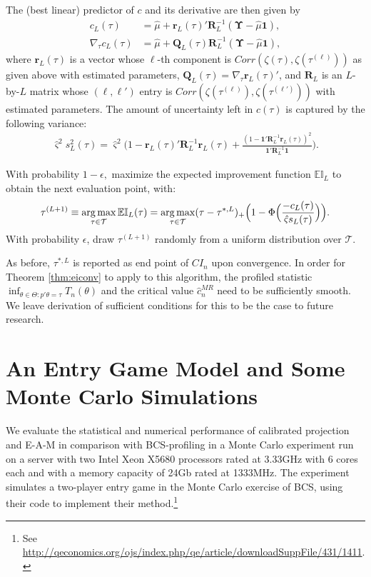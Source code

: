 \documentclass[letterpaper,11pt]{article}
\theoremstyle{myplain}
\theoremstyle{mydefinition}
\theoremstyle{myremark}
\def\argmax{\mathop{\rm arg\,max}}
\newcommand{\cT}{\mathcal{T}}
\newcommand{\EI}{\mathbb{EI}}
\numberwithin{equation}{section}
\numberwithin{figure}{section}
\begin{document}
\begin{appendix}
\begin{description}
	The (best linear) predictor of $c$ and its derivative  are then given by
	\begin{align}
		c_L(\tau)&=\hat\mu+\mathbf{r}_L(\tau)'\mathbf{R}_L^{-1}(\mathbf \Upsilon-\hat\mu \mathbf 1),\label{eq:cLdef_prof}\\
		\nabla_\tau c_L(\tau)&=\hat\mu+\mathbf{Q}_L(\tau)\mathbf{R}_L^{-1}(\mathbf \Upsilon-\hat\mu \mathbf 1),\label{eq:cLgrad_prof}
	\end{align}
	where $\mathbf r_L(\tau)$ is a vector whose $\ell$-th component is $Corr(\zeta(\tau),\zeta(\tau^{(\ell)}))$ as given above with estimated parameters, $\mathbf Q_L(\tau)=\nabla_\tau \mathbf r_L(\tau)'$, and $\mathbf R_L$ is an $L$-by-$L$ matrix whose $(\ell,\ell')$ entry is $Corr(\zeta(\tau^{(\ell)}),\zeta(\tau^{(\ell')}))$ with estimated parameters. The amount of uncertainty left in $c(\tau)$ is captured by the following variance:
\begin{align}
\hat\varsigma^2s^2_L(\tau)= \hat\varsigma^2\Big(1-\mathbf r_L(\tau)'\mathbf R_L^{-1}\mathbf r_L(\tau)+\frac{(1-\mathbf 1'\mathbf R_L^{-1}\mathbf r_L(\tau))^2}{\mathbf 1'\mathbf R_L^{-1}\mathbf 1}\Big). \label{eq:variance_prof}
\end{align}

	\item[M-step: (Maximization):] With probability $1-\epsilon,$ maximize the expected improvement function $\EI_L$ to obtain the next evaluation point, with:
	\begin{align}
		\tau^{(L+1)}\equiv\argmax_{\tau\in\cT}\EI_L(\tau)=\argmax_{\tau\in\cT} (\tau-\tau^{*,L})_+\Big(1-\Phi\Big(\frac{-c_L(\tau)}{\hat\varsigma s_L(\tau)}\Big)\Big).\label{eq:max_ei_prof}
	\end{align}
With probability $\epsilon$, draw $\tau^{(L+1)}$ randomly from a uniform distribution over $\cT$.
\end{description}

As before, $\tau^{*,L}$ is reported as end point of $CI_n$ upon convergence. In order for Theorem \ref{thm:eiconv} to apply to this algorithm, the profiled statistic $\inf_{\theta\in\Theta:p'\theta=\tau}T_n(\theta)$ and the critical value $\hat{c}_n^{MR}$ need to be sufficiently smooth. We leave derivation of sufficient conditions for this to be the case to future research.



\section{An Entry Game Model and Some Monte Carlo Simulations}
\label{sec:MC}
We evaluate the statistical and numerical performance of calibrated projection and E-A-M in comparison with BCS-profiling in a Monte Carlo experiment run on a server with two Intel Xeon X5680 processors rated at 3.33GHz with 6 cores each and with a memory capacity of 24Gb rated at 1333MHz.
The experiment simulates a two-player entry game in the Monte Carlo exercise of BCS, using their code to implement their method.\footnote{\label{ftn:BCS_code}See \url{http://qeconomics.org/ojs/index.php/qe/article/downloadSuppFile/431/1411}.}


\end{appendix}
\end{document}
